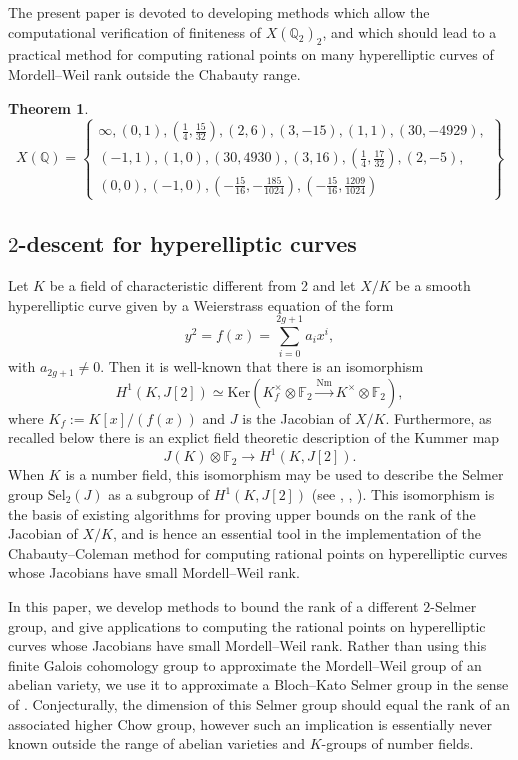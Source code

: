 \documentclass[11pt]{amsart}
\def\Q{\mathbb Q}
\def\F{\mathbb F}
\theoremstyle{plain}
\newtheorem{theorem}{Theorem}
\theoremstyle{definition}
\newcommand{\Sel}{\mathrm{Sel}}
\newcommand{\Nm}{\mathrm{Nm}}
\newcommand{\Ker}{\mathrm{Ker}}
\begin{document}
The present paper is devoted to developing methods which allow the computational verification of finiteness of $X(\Q _2 )_2 $, and which should lead to a practical method for computing rational points on many hyperelliptic curves of Mordell--Weil rank outside the Chabauty range.
\begin{theorem}\label{thm:BMSST_rational}
\[
X(\Q )=\left\{ \begin{array}{c} \infty ,(0, 1), (\frac{1}{4}, \frac{15}{32}), (2, 6),(3, -15), (1, 1), (30, -4929),  \\ (-1, 1), (1, 0), (30, 4930), (3, 16 ), (\frac{1}{4}, \frac{17}{32}), (2, -5), \\ (0, 0), (-1, 0), (-\frac{15}{16}, -\frac{185}{1024}), (-\frac{15}{16}, \frac{1209}{1024}) \end{array} \right\}
\]
\end{theorem}

\subsection{$2$-descent for hyperelliptic curves}
Let $K$ be a field of characteristic different from 2 and let $X/K$ be a smooth hyperelliptic curve given by a Weierstrass equation of the form
\[
y^2 =f(x)=\sum _{i=0}^{2g+1}a_i x^i ,
\]
with $a_{2g+1}\neq 0$. Then it is well-known that there is an isomorphism
\[
H^1 (K,J[2]) \simeq \Ker (K_f ^\times \otimes \mathbb{F}_2 \stackrel{\Nm }{\longrightarrow }K^\times \otimes \mathbb{F}_2 ),
\] 
where $K_f :=K[x]/(f(x))$ and $J$ is the Jacobian of $X/K$. Furthermore, as recalled below there is an explict field theoretic description of the Kummer map
\[
J(K)\otimes \F _2 \to H^1 (K,J[2]).
\]
When $K$ is a number field, this isomorphism may be used to describe the Selmer group $\Sel _2 (J)$ as a subgroup of $H^1 (K,J[2])$ (see \cite{schaefer}, \cite{PS97}, \cite{stoll:implementing}). This isomorphism is the basis of existing algorithms for proving upper bounds on the rank of the Jacobian of $X/K$, and is hence an essential tool in the implementation of the Chabauty--Coleman method for computing rational points on hyperelliptic curves whose Jacobians have small Mordell--Weil rank. 

In this paper, we develop methods to bound the rank of a different $2$-Selmer group, and give applications to computing the rational points on hyperelliptic curves whose Jacobians have small Mordell--Weil rank. Rather than using this finite Galois cohomology group to approximate the Mordell--Weil group of an abelian variety, we use it to approximate a Bloch--Kato Selmer group in the sense of \cite{BK}. Conjecturally, the dimension of this Selmer group should equal the rank of an associated higher Chow group, however such an implication is essentially never known outside the range of abelian varieties and $K$-groups of number fields.
\end{document}
